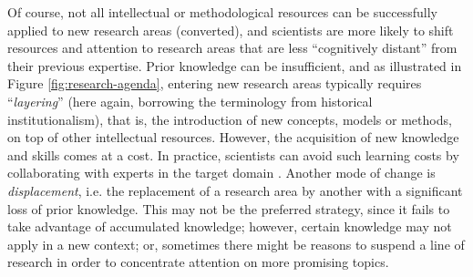 \documentclass{article}
\begin{document}
Of course, not all intellectual or methodological resources can be successfully applied to new research areas (converted), and scientists are more likely to shift resources and attention to research areas that are less ``cognitively distant'' from their previous expertise. Prior knowledge can be insufficient, and as illustrated in Figure \ref{fig:research-agenda}, entering new research areas typically requires ``\textit{layering}'' (here again, borrowing the terminology from historical institutionalism), that is, the introduction of new concepts, models or methods, on top of other intellectual resources. However, the acquisition of new knowledge and skills comes at a cost. In practice, scientists can avoid such learning costs by collaborating with experts in the target domain \citep{Tripodi2020}. Another mode of change is \textit{displacement}, i.e. the replacement of a research area by another with a significant loss of prior knowledge. %
This may not be the preferred strategy, since it fails to take advantage of accumulated knowledge; however, certain knowledge may not apply in a new context; or, sometimes there might be reasons to suspend a line of research in order to concentrate attention on more promising topics. 
\end{document}
